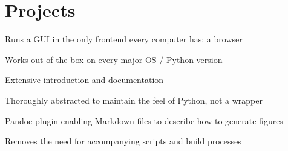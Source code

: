 \documentclass[]{resume}
\begin{document}
\begin{minipage}[t]{0.66\textwidth}
\section{Projects}

\begin{tightemize}
\item Runs a GUI in the only frontend every computer has: a browser
\item Works out-of-the-box on every major OS / Python version
\item Extensive introduction and documentation
\item Thoroughly abstracted to maintain the feel of Python, not a wrapper
\end{tightemize}

\sectionsep

\begin{tightemize}
\item Pandoc plugin enabling Markdown files to describe how to generate figures
\item Removes the need for accompanying scripts and build processes
\end{tightemize}
\sectionsep



% 
% 

\end{minipage}
\end{document}
